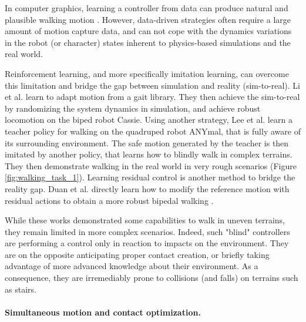 In computer graphics, learning a controller from data can produce natural and plausible walking motion \cite{learned_motion_matching, pfnn}.
However, data-driven strategies often require a large amount of motion capture data, and can not cope with the dynamics variations in the robot (or character) states inherent to physics-based simulations and the real world.

Reinforcement learning, and more specifically imitation learning, can overcome this limitation and bridge the gap between simulation and reality (sim-to-real).
Li et al. \cite{CassieLi2021} learn to adapt motion from a gait library. 
They then achieve the sim-to-real by randomizing the system dynamics in simulation, and achieve robust locomotion on the biped robot Cassie.
Using another strategy, Lee et al. \cite{hutter_challenging_terrain} learn a teacher policy for walking on the quadruped robot ANYmal, that is fully aware of its surrounding environment.
The safe motion generated by the teacher is then imitated by another policy, that learns how to blindly walk in complex terrains.
They then demonstrate walking in the real world in very rough scenarios (Figure \ref{fig:walking_task_1}).
Learning residual control is another method to bridge the reality gap. Duan et al. directly learn how to modify the reference motion with residual actions to obtain a more robust bipedal walking \cite{residual_rl_cassie_2021}.

While these works demonstrated some capabilities to walk in uneven terrains, they remain limited in more complex scenarios. 
Indeed, such "blind" controllers are performing a control only in reaction to impacts on the environment. They are on the opposite anticipating proper contact creation, or briefly taking advantage of more advanced knowledge about their environment. As a consequence, they are irremediably prone to collisions (and falls) on terrains such as stairs.

\paragraph{Simultaneous motion and contact optimization.\label{par:simul_contact_motion}}

